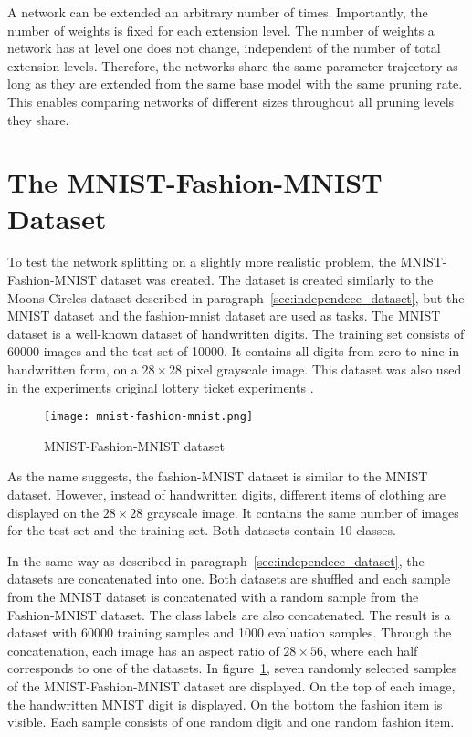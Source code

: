 A network can be extended an arbitrary number of times.
Importantly, the number of weights is fixed for each extension level.
The number of weights a network has at level one does not change, independent of the number of total extension levels.
Therefore, the networks share the same parameter trajectory as long as they are extended from the same base model with the same pruning rate.
This enables comparing networks of different sizes throughout all pruning levels they share.

\section{The MNIST-Fashion-MNIST Dataset}\label{sec:mnist}
To test the network splitting on a slightly more realistic problem, the MNIST-Fashion-MNIST dataset was created.
The dataset is created similarly to the Moons-Circles dataset described in paragraph~\ref{sec:independece_dataset}, but the MNIST dataset \autocite{mnist} and the fashion-mnist \autocite{fashion} dataset are used as tasks.
The MNIST dataset is a well-known dataset of handwritten digits. 
The training set consists of 60000 images and the test set of 10000.
It contains all digits from zero to nine in handwritten form, on a $28 \times 28$ pixel grayscale image.
This dataset was also used in the experiments original lottery ticket experiments \autocite{LTH}.

\begin{figure}[ht]
    \centering
    \texttt{[image: mnist-fashion-mnist.png]}
    \caption{
        MNIST-Fashion-MNIST dataset
    }\label{fig:mnist_fashion}
\end{figure}

As the name suggests, the fashion-MNIST dataset \autocite{fashion} is similar to the MNIST dataset.
However, instead of handwritten digits, different items of clothing are displayed on the $28 \times 28$ grayscale image.
It contains the same number of images for the test set and the training set.
Both datasets contain 10 classes.

In the same way as described in paragraph~\ref{sec:independece_dataset}, the datasets are concatenated into one.
Both datasets are shuffled and each sample from the MNIST dataset is concatenated with a random sample from the Fashion-MNIST dataset.
The class labels are also concatenated.
The result is a dataset with 60000 training samples and 1000 evaluation samples.
Through the concatenation, each image has an aspect ratio of $28 \times 56$, where each half corresponds to one of the datasets.
In figure~\ref{fig:mnist_fashion}, seven randomly selected samples of the  MNIST-Fashion-MNIST dataset are displayed.
On the top of each image, the handwritten MNIST digit is displayed. 
On the bottom the fashion item is visible.
Each sample consists of one random digit and one random fashion item. 

